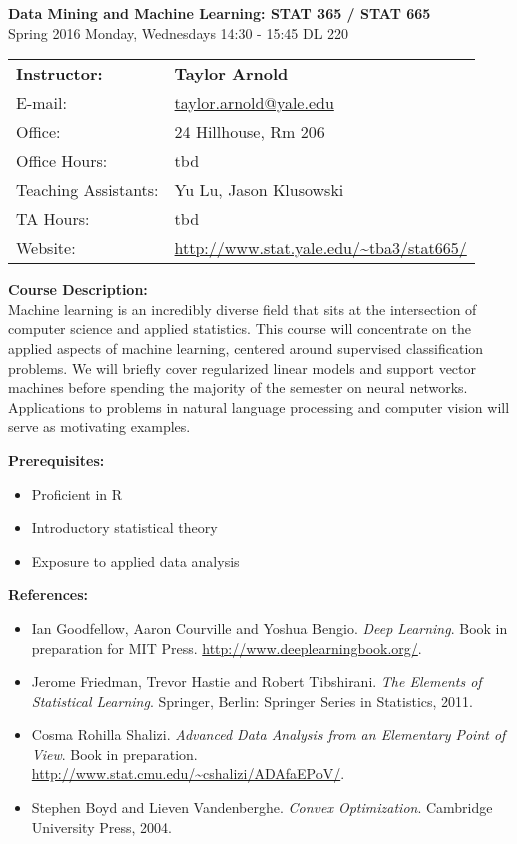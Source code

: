 \documentclass[12pt]{article}
\begin{document}
\begin{center}
{\bf Data Mining and Machine Learning: STAT 365 / STAT 665} \\
Spring 2016 \quad Monday, Wednesdays 14:30 - 15:45 \quad DL 220
\end{center}

\bigskip

\noindent
\begin{tabular}{ l l }
{\bf Instructor:} &  {\bf Taylor Arnold} \\
E-mail: & \href{mailto:taylor.arnold@yale.edu}{taylor.arnold@yale.edu} \\
Office: & 24 Hillhouse, Rm 206 \\
Office Hours: & tbd \\
Teaching Assistants: & Yu Lu, Jason Klusowski \\
TA Hours: & tbd \\
Website: & \url{http://www.stat.yale.edu/~tba3/stat665/}
\end{tabular}

\vspace{0.5cm}

{\bf Course Description:} \\

Machine learning is an incredibly diverse field that sits at
the intersection of computer science and applied statistics.
This course will concentrate on the applied aspects of machine
learning, centered around supervised classification problems.
We will briefly cover regularized linear models and support
vector machines before spending the majority of the semester
on neural networks. Applications to problems in natural
language processing and computer vision will serve as
motivating examples.

\vspace{0.2cm}

{\bf Prerequisites:}
\begin{itemize}\setlength\itemsep{0em}
\item Proficient in R
\item Introductory statistical theory
\item Exposure to applied data analysis
\end{itemize}

\vspace{0.2cm}

{\bf References:}
\begin{itemize}\setlength\itemsep{0em}
\item Ian Goodfellow, Aaron Courville and Yoshua Bengio. \textit{Deep Learning}. Book in preparation for MIT Press. \url{http://www.deeplearningbook.org/}.
\item Jerome Friedman, Trevor Hastie and Robert Tibshirani. \textit{The Elements of Statistical Learning}. Springer, Berlin: Springer Series in Statistics, 2011.
\item Cosma Rohilla Shalizi. \textit{Advanced Data Analysis from an Elementary Point of View}. Book in preparation. \url{http://www.stat.cmu.edu/~cshalizi/ADAfaEPoV/}.
\item Stephen Boyd and Lieven Vandenberghe. \textit{Convex Optimization}. Cambridge University Press, 2004.
\end{itemize}
\end{document}
